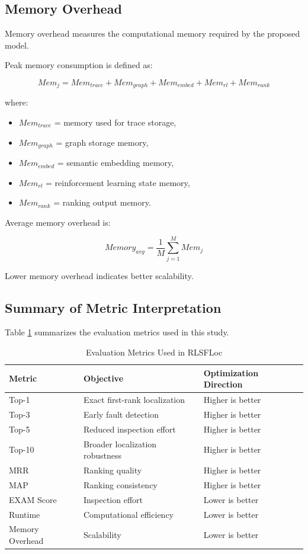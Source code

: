 \documentclass[article,article,submit,pdftex,moreauthors]{Definitions/mdpi}
\begin{document}
\subsection{Memory Overhead}

Memory overhead measures the computational memory required by the proposed model.

Peak memory consumption is defined as:

\begin{equation}
Mem_j =
Mem_{trace}
+
Mem_{graph}
+
Mem_{embed}
+
Mem_{rl}
+
Mem_{rank}
\end{equation}

where:
\begin{itemize}
    \item $Mem_{trace}$ = memory used for trace storage,
    \item $Mem_{graph}$ = graph storage memory,
    \item $Mem_{embed}$ = semantic embedding memory,
    \item $Mem_{rl}$ = reinforcement learning state memory,
    \item $Mem_{rank}$ = ranking output memory.
\end{itemize}

Average memory overhead is:

\begin{equation}
Memory_{avg} =
\frac{1}{M}
\sum_{j=1}^{M} Mem_j
\end{equation}

Lower memory overhead indicates better scalability.

\subsection{Summary of Metric Interpretation}

Table \ref{tab:evaluation_metrics} summarizes the evaluation metrics used in this study.

\begin{table}[H]
\caption{Evaluation Metrics Used in RLSFLoc}
\label{tab:evaluation_metrics}
\centering
\renewcommand{\arraystretch}{1.15}
\begin{tabular}{l l l}
\hline
\textbf{Metric} & \textbf{Objective} & \textbf{Optimization Direction} \\
\hline
Top-1 & Exact first-rank localization & Higher is better \\
Top-3 & Early fault detection & Higher is better \\
Top-5 & Reduced inspection effort & Higher is better \\
Top-10 & Broader localization robustness & Higher is better \\
MRR & Ranking quality & Higher is better \\
MAP & Ranking consistency & Higher is better \\
EXAM Score & Inspection effort & Lower is better \\
Runtime & Computational efficiency & Lower is better \\
Memory Overhead & Scalability & Lower is better \\
\hline
\end{tabular}
\end{table}
\end{document}
